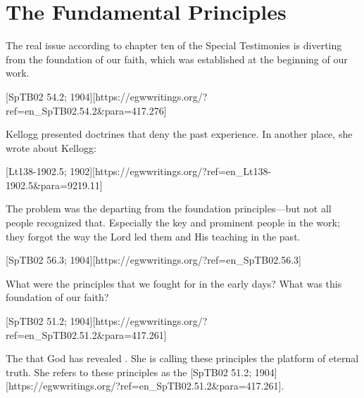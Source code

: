 \chapter{The Fundamental Principles}

The real issue according to chapter ten of the Special Testimonies is diverting from the foundation of our faith, which was established at the beginning of our work.

[SpTB02 54.2; 1904][https://egwwritings.org/?ref=en\_SpTB02.54.2&para=417.276]

Kellogg presented doctrines that deny the past experience. In another place, she wrote about Kellogg:

[Lt138-1902.5; 1902][https://egwwritings.org/?ref=en\_Lt138-1902.5&para=9219.11]

The problem was the departing from the foundation principles—but not all people recognized that. Especially the key and prominent people in the work; they forgot the way the Lord led them and His teaching in the past. 

[SpTB02 56.3; 1904][https://egwwritings.org/?ref=en\_SpTB02.56.3]

What were the principles that we fought for in the early days? What was this foundation of our faith?

[SpTB02 51.2; 1904][https://egwwritings.org/?ref=en\_SpTB02.51.2&para=417.261]

The  that God has revealed . She is calling these principles the platform of eternal truth. She refers to these principles as the [SpTB02 51.2; 1904][https://egwwritings.org/?ref=en\_SpTB02.51.2&para=417.261]. 

